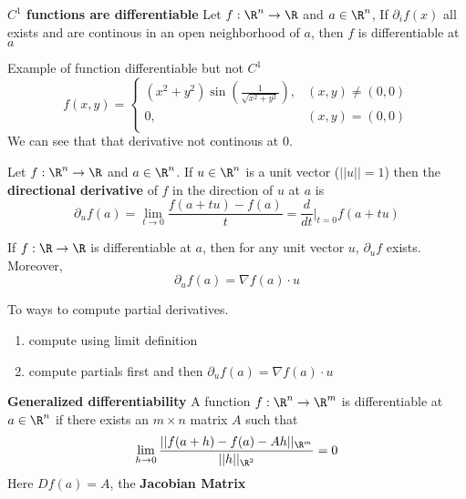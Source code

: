 \documentclass[11pt]{article}
\begin{document}
\begin{theorem}
  \label{C1 implies differentiability} \textbf{$C^1$ functions are differentiable}
  Let $f:\R^n\to\R$ and $a\in\R^n$, If $\partial_i f(x)$ all exists and are continous in an open neighborhood of $a$, then $f$ is differentiable at $a$
\end{theorem}


\begin{rem}
  Example of function differentiable but not $C^1$
  \[
    f(x,y) =
    \begin{cases}
      (x^2 + y^2)\sin(\frac{1}{\sqrt{x^2 + y^2}}), & (x,y)\neq (0,0)\\
      0,& (x,y) = (0,0)\\
    \end{cases}
  \]
  We can see that that derivative not continous at 0.\\
\end{rem}


\begin{defn*}
  \label{directional derivatives}
  Let $f:\R^n \to \R$ and $a\in\R^n$. If $u\in\R^n$ is a unit vector ($||u||=1$) then the \textbf{directional derivative} of $f$ in the direction of $u$ at $a$ is
  \[
    \partial_u f(a) = \lim_{t\to0} \frac{f(a + tu) - f(a)}{t} = \frac{d}{dt} \vert_{t=0} f(a+tu)
  \]
\end{defn*}

\begin{theorem*}
  If $f:\R \to\R$ is differentiable at $a$, then for any unit vector $u$, $\partial_u f$ exists. Moreover,
  \[
    \partial_u f(a) = \nabla f(a) \cdot u
  \]
\end{theorem*}

\begin{rem}
  To ways to compute partial derivatives.
  \begin{enumerate}
    \item compute using limit definition
    \item compute partials first and then $\partial_u f(a) = \nabla f(a) \cdot u$
  \end{enumerate}
\end{rem}

\begin{defn*}
  \label{generalized differentiability}
  \textbf{Generalized differentiability} A function $f: \R^n \to \R^m$ is differentiable at $a\in \R^n$ if there exists an $m\times n$ matrix $A$ such that
  \[
    \lim_{h\to 0} \frac{|| f(a+h) - f(a) - Ah ||_{\R^m}}{||h||_{\R^2}} = 0
  \]
  Here $Df(a) = A$, the \textbf{Jacobian Matrix}
\end{defn*}
\end{document}
